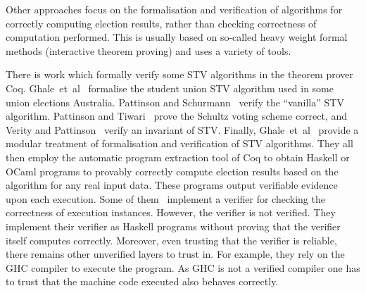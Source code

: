 \documentclass[10pt,conference]{IEEEtran}
\begin{document}
Other approaches focus on the  formalisation and verification of algorithms for correctly computing election results, rather than checking correctness of computation performed. This is usually based on so-called heavy weight formal methods (interactive theorem proving) and uses a variety of 
 tools. 


There is work which formally verify some STV algorithms in the theorem prover Coq. Ghale~et~al~\cite{Ghale:2017:FVS} formalise the student union STV algorithm used in some union elections Australia. Pattinson and Schurmann~\cite{DBLP:conf/ausai/PattinsonS15} verify the ``vanilla'' STV algorithm.   Pattinson and Tiwari~\cite{DBLP:conf/itp/PattinsonT17} prove the Schultz voting scheme correct, and Verity and Pattinson~\cite{DBLP:conf/acsw/VerityP17} verify an invariant of STV. Finally, Ghale~et~al~\cite{} provide a modular treatment of formalisation and verification of STV algorithms. They all then employ the automatic program extraction tool of Coq to obtain Haskell or OCaml programs to provably correctly compute election results based on the algorithm for any real input data. These programs output verifiable evidence upon each execution. Some of them~\cite{DBLP:conf/ausai/PattinsonS15,DBLP:conf/itp/PattinsonT17}    
 implement a verifier for checking the correctness of execution instances. However, the verifier is not verified. They implement their verifier as Haskell programs without proving that the verifier itself computes correctly. Moreover, even trusting that the verifier is reliable, there remains other unverified layers to trust in. For example, they rely on the GHC compiler to execute the program. As GHC is not a verified compiler one has to trust that the machine code executed also behaves correctly. 
  
\end{document}

